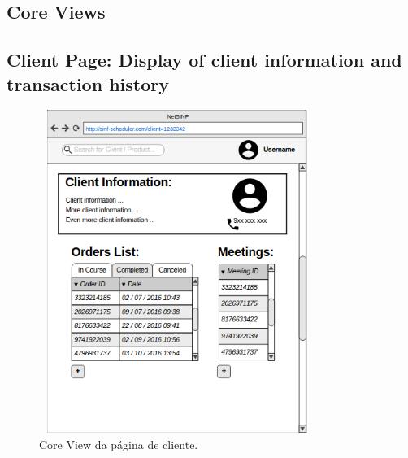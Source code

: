 \begin{titlepage}
\section{Core Views}

\subsection{Client Page: Display of client information and transaction history}

\begin{figure}[H]
  \centering
    \includegraphics[width=9cm, height = 10.5cm]{SINF_clientpage.png}
  \caption{Core View da página de cliente.}
  \label{uml}
\end{figure}


\end{titlepage}
